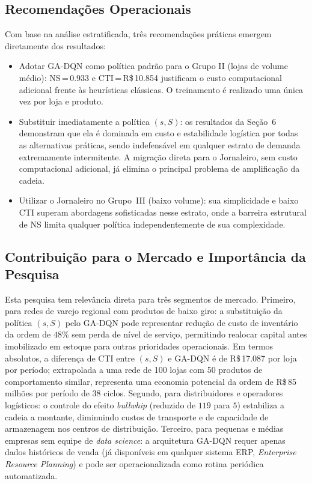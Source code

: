 \documentclass[a4paper,11pt]{article}
\begin{document}
\subsection{Recomendações Operacionais}

Com base na análise estratificada, três recomendações práticas
emergem diretamente dos resultados:

\begin{itemize}
  \item Adotar GA-DQN como política padrão para o Grupo II
    (lojas de volume médio): NS\,=\,$0.933$ e
    CTI\,=\,R\$\,10.854 justificam o custo computacional adicional
    frente às heurísticas clássicas. O treinamento é realizado uma
    única vez por loja e produto.
  \item Substituir imediatamente a política $(s,S)$: os resultados
    da Seção~6 demonstram que ela é dominada em custo e estabilidade
    logística por todas as alternativas práticas, sendo indefensável
    em qualquer estrato de demanda extremamente intermitente. A
    migração direta para o Jornaleiro, sem custo computacional
    adicional, já elimina o principal problema de amplificação da
    cadeia.
  \item Utilizar o Jornaleiro no Grupo~III (baixo volume):
    sua simplicidade e baixo CTI superam abordagens sofisticadas
    nesse estrato, onde a barreira estrutural de NS limita qualquer
    política independentemente de sua complexidade.
\end{itemize}

\subsection{Contribuição para o Mercado e Importância da Pesquisa}

Esta pesquisa tem relevância direta para três segmentos de mercado.
Primeiro, para redes de varejo regional com produtos de baixo
giro: a substituição da política $(s,S)$ pelo GA-DQN pode representar
redução de custo de inventário da ordem de $48\%$ sem perda de nível
de serviço, permitindo realocar capital antes imobilizado em estoque
para outras prioridades operacionais. Em termos absolutos, a diferença
de CTI entre $(s,S)$ e GA-DQN é de R\$\,17.087 por loja por período;
extrapolada a uma rede de 100 lojas com 50 produtos de comportamento
similar, representa uma economia potencial da ordem de
R\$\,85 milhões por período de 38 ciclos. Segundo, para
distribuidores e operadores logísticos: o controle do efeito
\textit{bullwhip} (reduzido de $119$ para $5$) estabiliza a cadeia a
montante, diminuindo custos de transporte e de capacidade de
armazenagem nos centros de distribuição. Terceiro, para
pequenas e médias empresas sem equipe de \textit{data science}:
a arquitetura GA-DQN requer apenas dados históricos de venda (já
disponíveis em qualquer sistema ERP, \textit{Enterprise Resource Planning})
e pode ser operacionalizada
como rotina periódica automatizada.
\end{document}
